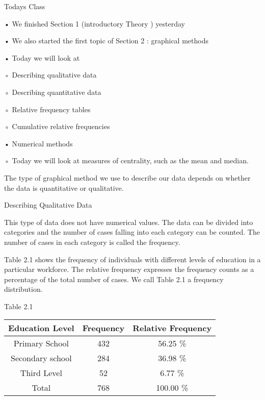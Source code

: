 
 

Todays Class

 
•
We finished Section 1 (introductory Theory ) yesterday


 
•
We also started the first topic of Section 2 : graphical methods


 
•
Today we will look at

◦
Describing qualitative data

◦
Describing quantitative data

◦
Relative frequency tables

◦
Cumulative relative frequencies


 
•
Numerical methods

◦
Today we will look at measures of centrality, such as the mean and median.


 

 



 The type of graphical method we use to describe our data depends on whether the data is quantitative or qualitative.

 
Describing Qualitative Data

 

This type of data does not have numerical values. The data can be divided into categories and the number of cases falling into each category can be counted. The number of cases in each category is called the frequency.

 

Table 2.1 shows the frequency of individuals with different levels of education in a particular workforce. The relative frequency expresses the frequency counts as a percentage of the total number of cases. We call Table 2.1 a frequency distribution.


Table 2.1

 \begin{tabular}{|c|c|c|}
Education Level   &     Frequency   &   Relative Frequency \\ \hline

Primary School    &        432         &        56.25 \% \\ \hline

Secondary school  &     284      &           36.98 \%  \\ \hline

Third Level       &          52        &           6.77 \% \\ \hline

Total  &                        768     &           100.00 \% \\ \hline
 \end{tabular} 



